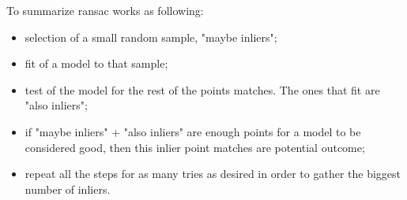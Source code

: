 To summarize \acrshort{ransac} works as following:

\begin{itemize}
	\item selection of a small random sample, "maybe inliers";
	\item fit of a model to that sample;
	\item test of the model for the rest of the points matches. The ones that fit are "also inliers";
	\item if "maybe inliers" + "also inliers" are enough points for a model to be considered good, then this inlier point matches are potential outcome;
	\item repeat all the steps for as many tries as desired in order to gather the biggest number of inliers.
\end{itemize}

